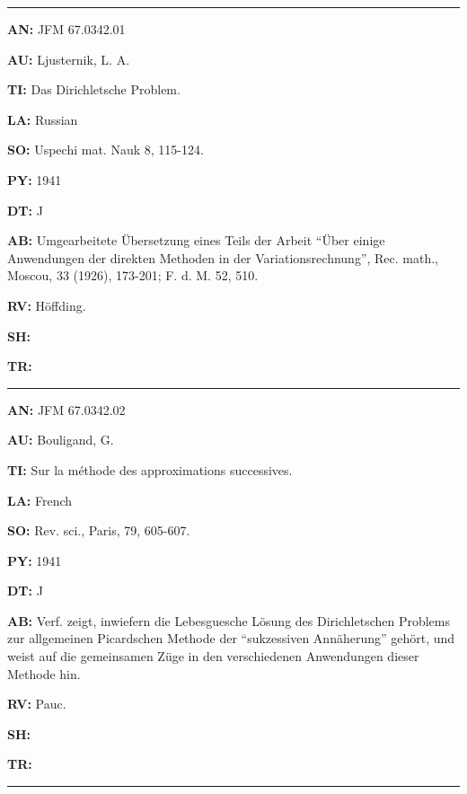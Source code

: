 \bigskip\par\noindent\hrule\bigskip\par

\item{\bf AN:} JFM 67.0342.01
\item{\bf AU:} Ljusternik, L. A.
\item{\bf TI:} Das Dirichletsche Problem.
\item{\bf LA:} Russian
\item{\bf SO:} Uspechi mat. Nauk 8, 115-124.
\item{\bf PY:} 1941
\item{\bf DT:} J
\item{\bf AB:}{\parindent15pt
 Umgearbeitete \"Ubersetzung eines Teils der Arbeit ``\"Uber einige
Anwendungen
der direkten Methoden in der Variationsrechnung'', Rec. math., Moscou,
33 (1926),
173-201; F. d. M. 52, 510.
}
\item{\bf RV:} H\"offding.
\item{\bf SH:}
\item{\bf TR:}

\bigskip\par\noindent\hrule\bigskip\par

\item{\bf AN:} JFM 67.0342.02
\item{\bf AU:} Bouligand, G.
\item{\bf TI:} Sur la m\'ethode des approximations successives.
\item{\bf LA:} French
\item{\bf SO:} Rev. sci., Paris, 79, 605-607.
\item{\bf PY:} 1941
\item{\bf DT:} J
\item{\bf AB:}{\parindent15pt
 Verf. zeigt, inwiefern
die Lebesguesche L\"osung des Dirichletschen Problems
zur allgemeinen Picardschen Methode der ``sukzessiven Ann\"aherung'' geh\"ort, und
weist auf die gemeinsamen Z\"uge in den verschiedenen Anwendungen dieser Methode
hin.
}
\item{\bf RV:} Pauc.
\item{\bf SH:}
\item{\bf TR:}

\bigskip\par\noindent\hrule\bigskip\par

